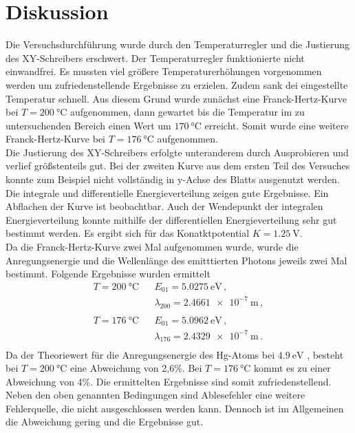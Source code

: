 \section{Diskussion}
\label{sec:Diskussion}

Die Versuchsdurchführung wurde durch den Temperaturregler und die Justierung des XY-Schreibers erschwert.
Der Temperaturregler funktionierte nicht einwandfrei.
Es mussten viel größere Temperaturerhöhungen vorgenommen werden um zufriedenstellende Ergebnisse zu erzielen.
Zudem sank dei eingestellte Temperatur schnell.
Aus diesem Grund wurde zunächst eine Franck-Hertz-Kurve bei $T = \SI{200}{\celsius}$ aufgenommen, dann gewartet bis
die Temperatur im zu untersuchenden Bereich einen Wert um $\SI{170}{\celsius}$ erreicht.
Somit wurde eine weitere Franck-Hertz-Kurve bei $T = \SI{176}{\celsius}$ aufgenommen. \\
\noindent
Die Justierung des XY-Schreibers erfolgte unteranderem durch Ausprobieren und verlief größstenteils gut.
Bei der zweiten Kurve aus dem ersten Teil des Versuches konnte zum Beispiel nicht vollständig in y-Achse des Blatts ausgenutzt werden. \\%


\noindent
Die integrale und differentielle Energieverteilung zeigen gute Ergebnisse.
Ein Abflachen der Kurve ist beobachtbar.
Auch der Wendepunkt der integralen Energieverteilung konnte mithilfe der differentiellen Energieverteilung sehr gut bestimmt werden.
Es ergibt sich für das Konatktpotential $K = \SI{1.25}{\volt}$. \\


\noindent
Da die Franck-Hertz-Kurve zwei Mal aufgenommen wurde, wurde die Anregungsenergie und die Wellenlänge des emitttierten Photons jeweils 
zwei Mal bestimmt.
Folgende Ergebnisse wurden ermittelt
\begin{align*}
    T = \SI{200}{\celsius}&                  &E_{01}=\SI{5.0275}{\electronvolt} \, , \\
                          &          &\lambda_{200} = \SI{2.4661e-7}{\metre} \, , \\
                                    \\
    T = \SI{176}{\celsius}&                  &E_{01}=\SI{5.0962}{\electronvolt}  \, , \\
                          &          &\lambda_{176} = \SI{2.4329e-7}{\metre} \, . \\
\end{align*}
\noindent
Da der Theoriewert für die Anregungsenergie des Hg-Atoms bei $\SI{4.9}{\electronvolt}$ \cite{theo}, besteht bei $T = \SI{200}{\celsius}$ eine Abweichung von 2,6\%.
Bei $T = \SI{176}{\celsius}$ kommt es zu einer Abweichung von 4\%.
Die ermittelten Ergebnisse sind somit zufriedenstellend.\\
\noindent
Neben den oben genannten Bedingungen sind Ablesefehler eine weitere Fehlerquelle, die nicht ausgeschlossen werden kann.
Dennoch ist im Allgemeinen die Abweichung gering und die Ergebnisse gut.

